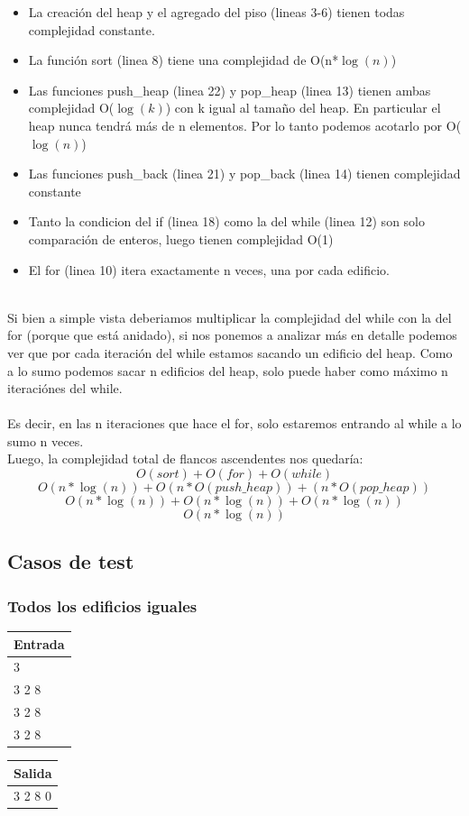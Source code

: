 \begin{itemize}
\item La creaci\'on del heap y el agregado del piso (lineas 3-6) tienen todas complejidad constante.
\item La funci\'on sort (linea 8) tiene una complejidad de O(n*$\log(n)$) 
\item Las funciones push\_heap (linea 22) y pop\_heap (linea 13) tienen ambas complejidad O($\log(k)$) con k igual al tamaño del heap. En particular el heap nunca tendr\'a m\'as de n elementos. Por lo tanto podemos acotarlo por O($\log(n)$) 
\item Las funciones push\_back (linea 21) y pop\_back (linea 14) tienen complejidad constante 
\item Tanto la condicion del if (linea 18) como la del while (linea 12) son solo comparaci\'on de enteros, luego tienen complejidad O(1)
\item El for (linea 10) itera exactamente n veces, una por cada edificio. 
\end{itemize}
\\
Si bien a simple vista deberiamos multiplicar la complejidad del while con la del for (porque que est\'a anidado), si nos ponemos a analizar m\'as en detalle podemos ver que por cada iteraci\'on del while estamos sacando un edificio del heap. Como a lo sumo podemos sacar n edificios del heap, solo puede haber como m\'aximo n iteraci\'ones del while.\\ \\
Es decir, en las n iteraciones que hace el for, solo estaremos entrando al while a lo sumo n veces.\\ Luego, la complejidad total de flancos ascendentes nos quedar\'ia:
\\
$$O(sort)+O(for)+O(while)$$
$$O(n*\log(n))+O(n*O(push\_heap))+(n*O(pop\_heap))$$
$$O(n*\log(n))+O(n*\log(n))+O(n*\log(n))$$
$$O(n*\log(n))$$


\subsection{Casos de test}


\subsubsection{Todos los edificios iguales}

\quad \quad \quad  \begin{tabular}{| l |}
\hline
Entrada \\ \hline
3 \\ \hline
3 2 8 \\ 
3 2 8 \\
3 2 8 \\ \hline
\end{tabular}
\quad \quad \quad 
\begin{tabular}{| l |}
\hline
Salida \\ \hline
3 2 8 0  \\ \hline
\end{tabular}





